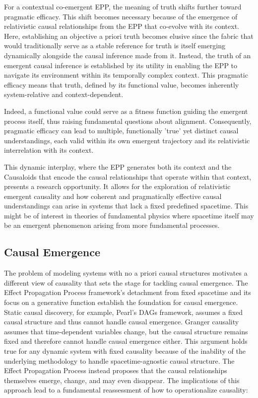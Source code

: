 For a contextual co-emergent EPP, the meaning of truth shifts further toward pragmatic efficacy. This shift becomes necessary because of the emergence of relativistic causal relationships from the EPP that co-evolve with its context. Here, establishing an objective a priori truth becomes elusive since the fabric that would traditionally serve as a stable reference for truth is itself emerging dynamically alongside the causal inference made from it. Instead, the truth of an emergent causal inference is established by its utility in enabling the EPP to navigate its environment within its temporally complex context.
This pragmatic efficacy means that truth, defined by its functional value, becomes inherently system-relative and context-dependent.

Indeed, a functional value could serve as a fitness function guiding the emergent process itself, thus raising fundamental questions about alignment. Consequently, pragmatic efficacy can lead to multiple, functionally 'true' yet distinct causal understandings, each valid within its own emergent trajectory and its relativistic interrelation with its context.

This dynamic interplay, where the EPP generates both its context and the Causaloids that encode the causal relationships that operate within that context, presents a research opportunity. It allows for the exploration of relativistic emergent causality and how coherent and pragmatically effective causal understandings can arise in systems that lack a fixed predefined spacetime. This might be of interest in theories of fundamental physics where spacetime itself may be an emergent phenomenon arising from more fundamental processes.

\subsection{Causal Emergence}

\label{sec:causal_emergence}

The problem of modeling systems with no a priori causal structures motivates a different view of causality that sets the stage for tackling  causal emergence. The Effect Propagation Process framework's detachment from fixed spacetime and its focus on a generative function establish the foundation for causal emergence. Static causal discovery, for example, Pearl’s DAGs framework, assumes a fixed causal structure and thus cannot handle causal emergence. Granger causality assumes that time-dependent variables change, but the causal structure remains fixed and therefore cannot handle causal emergence either. This argument holds true for any dynamic system with fixed causality because of the inability of the underlying methodology to handle spacetime-agnostic causal structure. The Effect Propagation Process instead proposes that the causal relationships themselves emerge, change, and may even disappear. The implications of this approach lead to a fundamental reassessment of how to operationalize causality:


